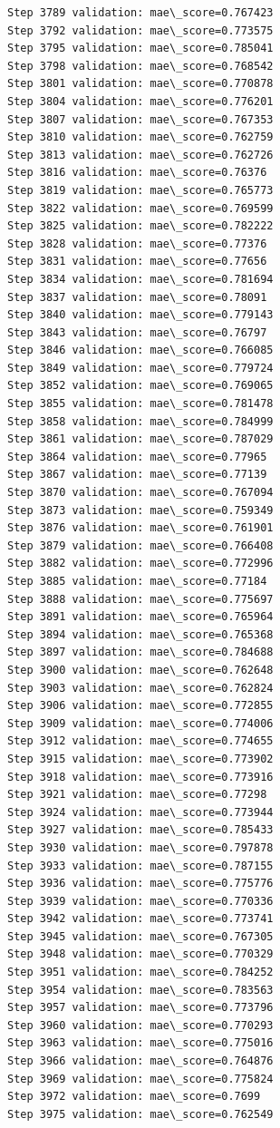 \documentclass[11pt]{article}
\begin{document}
\begin{Verbatim}[commandchars=\\\{\}]
Step 3789 validation: mae\_score=0.767423
Step 3792 validation: mae\_score=0.773575
Step 3795 validation: mae\_score=0.785041
Step 3798 validation: mae\_score=0.768542
Step 3801 validation: mae\_score=0.770878
Step 3804 validation: mae\_score=0.776201
Step 3807 validation: mae\_score=0.767353
Step 3810 validation: mae\_score=0.762759
Step 3813 validation: mae\_score=0.762726
Step 3816 validation: mae\_score=0.76376
Step 3819 validation: mae\_score=0.765773
Step 3822 validation: mae\_score=0.769599
Step 3825 validation: mae\_score=0.782222
Step 3828 validation: mae\_score=0.77376
Step 3831 validation: mae\_score=0.77656
Step 3834 validation: mae\_score=0.781694
Step 3837 validation: mae\_score=0.78091
Step 3840 validation: mae\_score=0.779143
Step 3843 validation: mae\_score=0.76797
Step 3846 validation: mae\_score=0.766085
Step 3849 validation: mae\_score=0.779724
Step 3852 validation: mae\_score=0.769065
Step 3855 validation: mae\_score=0.781478
Step 3858 validation: mae\_score=0.784999
Step 3861 validation: mae\_score=0.787029
Step 3864 validation: mae\_score=0.77965
Step 3867 validation: mae\_score=0.77139
Step 3870 validation: mae\_score=0.767094
Step 3873 validation: mae\_score=0.759349
Step 3876 validation: mae\_score=0.761901
Step 3879 validation: mae\_score=0.766408
Step 3882 validation: mae\_score=0.772996
Step 3885 validation: mae\_score=0.77184
Step 3888 validation: mae\_score=0.775697
Step 3891 validation: mae\_score=0.765964
Step 3894 validation: mae\_score=0.765368
Step 3897 validation: mae\_score=0.784688
Step 3900 validation: mae\_score=0.762648
Step 3903 validation: mae\_score=0.762824
Step 3906 validation: mae\_score=0.772855
Step 3909 validation: mae\_score=0.774006
Step 3912 validation: mae\_score=0.774655
Step 3915 validation: mae\_score=0.773902
Step 3918 validation: mae\_score=0.773916
Step 3921 validation: mae\_score=0.77298
Step 3924 validation: mae\_score=0.773944
Step 3927 validation: mae\_score=0.785433
Step 3930 validation: mae\_score=0.797878
Step 3933 validation: mae\_score=0.787155
Step 3936 validation: mae\_score=0.775776
Step 3939 validation: mae\_score=0.770336
Step 3942 validation: mae\_score=0.773741
Step 3945 validation: mae\_score=0.767305
Step 3948 validation: mae\_score=0.770329
Step 3951 validation: mae\_score=0.784252
Step 3954 validation: mae\_score=0.783563
Step 3957 validation: mae\_score=0.773796
Step 3960 validation: mae\_score=0.770293
Step 3963 validation: mae\_score=0.775016
Step 3966 validation: mae\_score=0.764876
Step 3969 validation: mae\_score=0.775824
Step 3972 validation: mae\_score=0.7699
Step 3975 validation: mae\_score=0.762549

\end{Verbatim}
\end{document}
